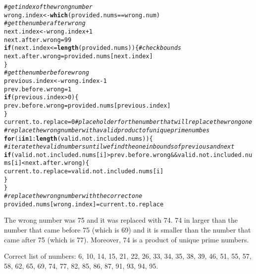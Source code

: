 \documentclass{article}\usepackage[]{graphicx}\usepackage[]{xcolor}
\makeatletter
\newcommand{\hlnum}[1]{\textcolor[rgb]{0.686,0.059,0.569}{#1}}%
\newcommand{\hlcom}[1]{\textcolor[rgb]{0.678,0.584,0.686}{\textit{#1}}}%
\newcommand{\hlopt}[1]{\textcolor[rgb]{0,0,0}{#1}}%
\newcommand{\hldef}[1]{\textcolor[rgb]{0.345,0.345,0.345}{#1}}%
\newcommand{\hlkwa}[1]{\textcolor[rgb]{0.161,0.373,0.58}{\textbf{#1}}}%
\newcommand{\hlkwb}[1]{\textcolor[rgb]{0.69,0.353,0.396}{#1}}%
\newcommand{\hlkwd}[1]{\textcolor[rgb]{0.737,0.353,0.396}{\textbf{#1}}}%
\newenvironment{kframe}{%
 \def\at@end@of@kframe{}%
 \ifinner\ifhmode%
  \def\at@end@of@kframe{\end{minipage}}%
  \begin{minipage}{\columnwidth}%
 \fi\fi%
 \def\FrameCommand##1{\hskip\@totalleftmargin \hskip-\fboxsep
 \colorbox{shadecolor}{##1}\hskip-\fboxsep
     \hskip-\linewidth \hskip-\@totalleftmargin \hskip\columnwidth}%
 \MakeFramed {\advance\hsize-\width
   \@totalleftmargin\z@ \linewidth\hsize
   \@setminipage}}%
 {\par\unskip\endMakeFramed%
 \at@end@of@kframe}
\newenvironment{knitrout}{}{} %
\makeatother
\begin{document}
\begin{enumerate}
\begin{knitrout}
\begin{kframe}
\begin{alltt}
\hlcom{#get index of the wrong number}
\hldef{wrong.index} \hlkwb{<-} \hlkwd{which}\hldef{(provided.nums}\hlopt{==}\hldef{wrong.num)}
\hlcom{#get the number after wrong }
\hldef{next.index} \hlkwb{<-} \hldef{wrong.index}\hlopt{+}\hlnum{1}
\hldef{next.after.wrong} \hlkwb{=} \hlnum{99}
\hlkwa{if} \hldef{(next.index} \hlopt{<=} \hlkwd{length}\hldef{(provided.nums))\{} \hlcom{#check bounds}
  \hldef{next.after.wrong} \hlkwb{=} \hldef{provided.nums[next.index]}
\hldef{\}}
\hlcom{#get the number before wrong}
\hldef{previous.index} \hlkwb{<-} \hldef{wrong.index}\hlopt{-}\hlnum{1}
\hldef{prev.before.wrong} \hlkwb{=} \hlnum{1}
\hlkwa{if} \hldef{(previous.index} \hlopt{>} \hlnum{0}\hldef{)\{}
  \hldef{prev.before.wrong} \hlkwb{=} \hldef{provided.nums[previous.index]}
\hldef{\}}
\hldef{current.to.replace} \hlkwb{=} \hlnum{0} \hlcom{#placeholder for the number that will replace the wrong one}
\hlcom{#replace the wrong number with a valid product of unique prime numbes}
\hlkwa{for} \hldef{(i} \hlkwa{in} \hlnum{1}\hlopt{:}\hlkwd{length}\hldef{(valid.not.included.nums))\{}
  \hlcom{#iterate the valid numbers until we find the one in bounds of previous and next}
  \hlkwa{if} \hldef{(valid.not.included.nums[i]} \hlopt{>} \hldef{prev.before.wrong} \hlopt{&&} \hldef{valid.not.included.nums[i]} \hlopt{<} \hldef{next.after.wrong)\{}
    \hldef{current.to.replace} \hlkwb{=} \hldef{valid.not.included.nums[i]}
  \hldef{\}}
\hldef{\}}
\hlcom{#replace the wrong number with the correct one}
\hldef{provided.nums[wrong.index]} \hlkwb{=} \hldef{current.to.replace}
\end{alltt}
\end{kframe}
\end{knitrout}
The wrong number was 75 and it was replaced with 74. 74 in larger than the number that came before 75 (which is 69) and it is smaller than the number that came after 75 (which is 77). Moreover, 74 is a product of unique prime numbers.

Correct list of numbers: 6, 10, 14, 15, 21, 22, 26, 33, 34, 35, 38, 39, 46, 51, 55, 57, 58, 62, 65, 69, 74, 77, 82, 85, 86, 87, 91, 93, 94, 95.
\end{enumerate}


\end{document}
